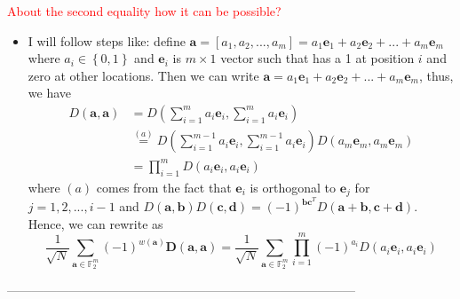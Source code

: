 \documentclass{article}
\begin{document}
\textcolor{red}{
About the second equality how it can be possible?} 
\begin{itemize}
	\item[\ding{45}] I will follow steps like: define $\mathbf{a} = [a_1, a_2, ..., a_m] = a_1\mathbf{e}_1 + a_2\mathbf{e}_2 + ...+a_m\mathbf{e}_m$ where $a_i \in \left\{0, 1 \right\}$ and $\mathbf{e}_i$ is $m \times 1$ vector such that has a 1 at position $i$ and zero at other locations. Then we can write 
	$\mathbf{a} = a_1 \mathbf{e}_1 + a_2 \mathbf{e}_2 +...+a_m \mathbf{e}_m$, thus, we have
	\begin{align*}
	 	 D\left(\mathbf{a}, \mathbf{a}\right)& =  D\left(\sum_{i=1}^{m}{a_i \mathbf{e}_i} , \sum_{i=1}^{m}{a_i \mathbf{e}_i} \right)  \\
	 	& \stackrel{(a)}{=} D\left(\sum_{i=1}^{m-1}{a_i \mathbf{e}_i} , \sum_{i=1}^{m-1}{a_i \mathbf{e}_i} \right)D\left(a_m \mathbf{e}_m, a_m \mathbf{e}_m\right) \\
	 	&= \prod_{i=1}^{m}D\left(a_i \mathbf{e}_i, a_i \mathbf{e}_i\right)
	\end{align*}
where $(a)$ comes from the fact that $\mathbf{e}_i$ is orthogonal to $\mathbf{e}_j$ for $j=1,2,...,i-1$ and $D(\mathbf{a,b}) D(\mathbf{c,d}) = (-1)^{\mathbf{b}\mathbf{c}^T} D(\mathbf{a+b}, \mathbf{c+d})$. 
Hence, we can rewrite as 
\begin{equation*}
	\frac{1}{\sqrt{N}}	\sum_{\mathbf{a} \in \mathbb{F}_2^m} (-1)^{w(\mathbf{a})}\mathbf{D}(\mathbf{a}, \mathbf{a}) = \frac{1}{\sqrt{N}}{\sum_{\mathbf{a} \in \mathbb{F}_2^m} \prod_{i=1}^{m} (-1)^{a_i} D\left(a_i \mathbf{e}_i, a_i \mathbf{e}_i\right)}
\end{equation*}
\end{itemize}
------------------------------------------------------------------------------------



\end{document}
